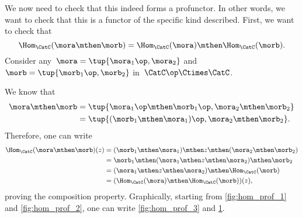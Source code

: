 
We now need to check that this indeed forms a profunctor.
In other words, we want to check that this is a functor of the specific kind described.
First, we want to check that
%
\begin{equation}
    \label{eq:hom5}
    \Hom_\CatC(\mora \mthen \morb)=\Hom_\CatC(\mora)\mthen \Hom_\CatC(\morb).
\end{equation}
Consider any~$\mora=\tup{\mora_1\op, \mora_2}$ and~$\morb=\tup{\morb_1\op,\morb_2}$ in~$\CatC\op \Ctimes \CatC$.

We know that
\begin{equation}
    \label{eq:hom6}
    \begin{aligned}
        \mora\mthen \morb & =\tup{\mora_1\op \mthen \morb_1\op, \mora_2\mthen \morb_2} \\
                          & =\tup{(\morb_1\mthen \mora_1)\op, \mora_2\mthen \morb_2}.
    \end{aligned}
\end{equation}
Therefore, one can write
\begin{equation}
    \label{eq:hom7}
    \begin{aligned}
        \Hom_\CatC(\mora \mthen \morb)(z) & =(\morb_1\mthen \mora_1)\mthen z \mthen (\mora_2\mthen \morb_2) \\
                                          & =\morb_1\mthen (\mora_1\mthen z \mthen \mora_2) \mthen \morb_2 \\
                                          & =(\mora_1\mthen z \mthen \mora_2)\mthen \Hom_\CatC(\morb) \\
                                          & =(\Hom_\CatC(\mora)\mthen \Hom_\CatC(\morb))(z),
    \end{aligned}
\end{equation}
proving the composition property.
Graphically, starting from \cref{fig:hom_prof_1} and \cref{fig:hom_prof_2}, one can write \cref{fig:hom_prof_3} and \cref{fig:hom_prof_4}.

\begin{marginfigure}
    \centering
    \caption{\label{fig:hom_prof_1}}
\end{marginfigure}
\begin{marginfigure}
    \centering
    \caption{\label{fig:hom_prof_2}}
\end{marginfigure}
\begin{marginfigure}
    \centering
    \caption{\label{fig:hom_prof_3}}
\end{marginfigure}
\begin{figure}[h!]
    \centering
    \caption{\label{fig:hom_prof_4}}
\end{figure}

